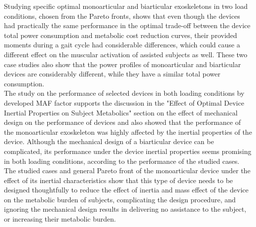 \documentclass[10pt,letterpaper]{article}
\begin{document}
Studying specific optimal monoarticular and biarticular exoskeletons in two load conditions, chosen from the Pareto fronts, shows that even though the devices had practically the same performance in the optimal trade-off between the device total power consumption and metabolic cost reduction curves, their provided moments during a gait cycle had considerable differences, which could cause a different effect on the muscular activation of assisted subjects as well. These two case studies also show that the power profiles of monoarticular and biarticular devices are considerably different, while they have a similar total power consumption.\\
The study on the performance of selected devices in both loading conditions by developed MAF factor supports the discussion in the "Effect of Optimal Device Inertial Properties on Subject Metabolics" section on the effect of mechanical design on the performance of devices and also showed that the performance of the monoarticular exoskeleton was highly affected by the inertial properties of the device. Although the mechanical design of a biarticular device can be complicated, its performance under the device inertial properties seems promising in both loading conditions, according to the performance of the studied cases. The studied cases and general Pareto front of the monoarticular device under the effect of its inertial characteristics show that this type of device needs to be designed thoughtfully to reduce the effect of inertia and mass effect of the device on the metabolic burden of subjects, complicating the design procedure, and ignoring the mechanical design results in delivering no assistance to the subject, or increasing their metabolic burden. 
\end{document}
